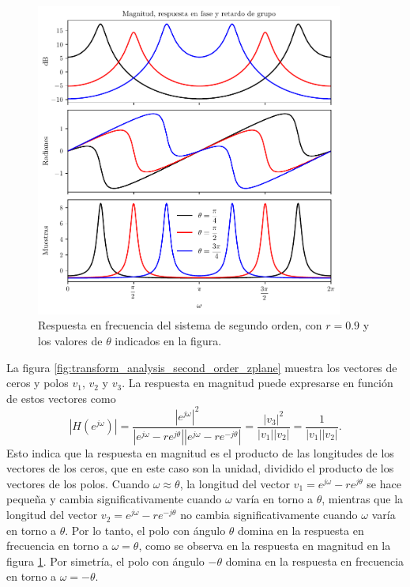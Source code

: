 \documentclass[a4paper]{report}
\begin{document}
\begin{figure}[!htb]
 \begin{center}
 \includegraphics[width=0.9\textwidth]{figuras/transform_analysis_second_order_freq_response_theta.pdf}
 \caption{\label{fig:transform_analysis_second_order_freq_response_theta} Respuesta en frecuencia del sistema de segundo orden, con \(r=0.9\) y los valores de \(\theta\) indicados en la figura.}
 \end{center}
\end{figure}
La figura \ref{fig:transform_analysis_second_order_zplane} muestra los vectores de ceros y polos \(v_1\), \(v_2\) y \(v_3\). La respuesta en magnitud puede expresarse en función de estos vectores como
\[
 |H(e^{j\omega})|=\frac{|e^{j\omega}|^2}{|e^{j\omega}-re^{j\theta}||e^{j\omega}-re^{-j\theta}|}
 =\frac{|v_3|^2}{|v_1||v_2|}=\frac{1}{|v_1||v_2|}.
\]
Esto indica que la respuesta en magnitud es el producto de las longitudes de los vectores de los ceros, que en este caso son la unidad, dividido el producto de los vectores de los polos. Cuando \(\omega\approx\theta\), la longitud del vector \(v_1=e^{j\omega}-re^{j\theta}\) se hace pequeña y cambia significativamente cuando \(\omega\) varía en torno a \(\theta\), mientras que la longitud del vector \(v_2=e^{j\omega}-re^{-j\theta}\) no cambia significativamente cuando \(\omega\) varía en torno a \(\theta\). Por lo tanto, el polo con ángulo \(\theta\) domina en la respuesta en frecuencia en torno a \(\omega=\theta\), como se observa en la respuesta en magnitud en la figura \ref{fig:transform_analysis_second_order_freq_response_theta}. Por simetría, el polo con ángulo \(-\theta\) domina en la respuesta en frecuencia en torno a \(\omega=-\theta\).
\end{document}
